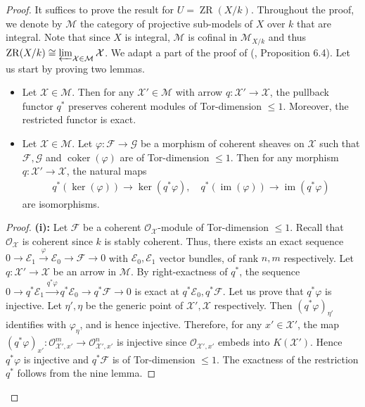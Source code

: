 \documentclass [11pt,reqno]{amsart}
\newcommand{\1}{\mathmybb{1}}
\def\cE{{\mathcal{E}}}
\def\cF{{\mathcal{F}}}
\def\cG{{\mathcal{G}}}
\def\cM{{\mathcal{M}}}
\def\cO{{\mathcal{O}}}
\def\cX{{\mathcal{X}}}
\def\coker{\operatorname{coker}}
\def\im{\operatorname{im}}
\def\ZR{\operatorname{ZR}}
\begin{document}
\begin{proof}
It suffices to prove the result for $U=\ZR(X/k)$. Throughout the proof, we denote by $\cM$ the category of projective sub-models of $X$ over $k$ that are integral. Note that since $X$ is integral, $\cM$ is cofinal in $\cM_{X/k}$ and thus $\ZR(X/k)\cong\varprojlim_{\cX\in\cM}\cX$. We adapt a part of the proof of (\cite{Kerz17}, Proposition 6.4). Let us start by proving two lemmas. 

\begin{lemma}
\label{lemma:Tor-dimension_pullback}
\begin{itemize}
		\item[(i)] Let $\cX\in\cM$. Then for any $\cX' \in \cM$ with arrow $q:\cX'\to \cX$, the pullback functor $q^{\ast}$ preserves coherent modules of Tor-dimension $\leq 1$. Moreover, the restricted functor is exact.
		
		\item[(ii)] Let $\cX\in \cM$. Let $\varphi : \cF \to \cG$ be a morphism of coherent sheaves on $\cX$ such that $\cF,\cG$ and $\coker(\varphi)$ are of Tor-dimension $\leq 1$. Then for any morphism $q:\cX'\to \cX$, the natural maps
		\begin{align*}
		q^{\ast}(\ker(\varphi)) \to \ker(q^{\ast}\varphi), \quad q^{\ast}(\im(\varphi)) \to \im(q^{\ast}\varphi)
		\end{align*}
		are isomorphisms.
\end{itemize}
\end{lemma}

\begin{proof}
\textbf{(i):} Let $\cF$ be a coherent $\cO_{\cX}$-module of Tor-dimension $\leq 1$. Recall that $\cO_{\cX}$ is coherent since $k$ is stably coherent. Thus, there exists an exact sequence $\displaystyle 0\to\cE_{1}\xrightarrow{\varphi}\cE_{0}\to\cF\to 0$ with $\cE_{0},\cE_{1}$ vector bundles, of rank $n,m$ respectively.  Let $q:\cX'\to \cX$ be an arrow in $\cM$. By right-exactness of $q^{\ast}$, the sequence $0\to q^{\ast}\cE_{1}\xrightarrow{q^{\ast}\varphi} q^{\ast}\cE_{0} \to q^{\ast}\cF\to 0$ is exact at $q^{\ast}\cE_{0},q^{\ast}\cF$. Let us prove that $q^{\ast}\varphi$ is injective. Let $\eta',\eta$ be the generic point of $\cX',\cX$ respectively. Then $(q^{\ast}\varphi)_{\eta'}$ identifies with $\varphi_{\eta}$, and is hence injective. Therefore, for any $x'\in \cX'$, the map $(q^{\ast}\varphi)_{x'}:\cO_{\cX',x'}^{m}\to\cO_{\cX',x'}^{n}$ is injective since $\cO_{\cX',x'}$ embeds into $K(\cX')$. Hence $q^{\ast}\varphi$ is injective and $q^{\ast}\cF$ is of Tor-dimension $\leq 1$. The exactness of the restriction $q^{\ast}$ follows from the nine lemma. 


\end{proof}
\end{proof}
\end{document}
